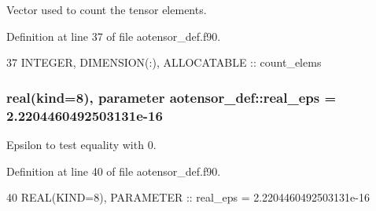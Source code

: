 Vector used to count the tensor elements. 



Definition at line 37 of file aotensor\+\_\+def.\+f90.


\begin{DoxyCode}
37   \textcolor{keywordtype}{INTEGER}, \textcolor{keywordtype}{DIMENSION(:)}, \textcolor{keywordtype}{ALLOCATABLE} :: count\_elems
\end{DoxyCode}
\subsubsection[{\texorpdfstring{real\+\_\+eps}{real_eps}}]{\setlength{\rightskip}{0pt plus 5cm}real(kind=8), parameter aotensor\+\_\+def\+::real\+\_\+eps = 2.\+2204460492503131e-\/16\hspace{0.3cm}{\ttfamily [private]}}\hypertarget{namespaceaotensor__def_ab1cf9313fb1def1a17de539cfa922e35}{}\label{namespaceaotensor__def_ab1cf9313fb1def1a17de539cfa922e35}


Epsilon to test equality with 0. 



Definition at line 40 of file aotensor\+\_\+def.\+f90.


\begin{DoxyCode}
40   \textcolor{keywordtype}{REAL(KIND=8)}, \textcolor{keywordtype}{PARAMETER} :: real\_eps = 2.2204460492503131e-16
\end{DoxyCode}
